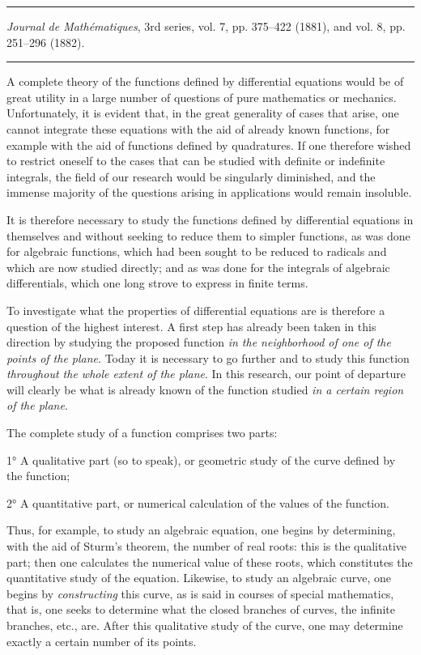\documentclass[11pt]{article}
\newcommand{\shortline}{\begin{center}\rule{3.5em}{0.4pt}\end{center}}
\begin{document}
\shortline

\begin{center}
\emph{Journal de Mathématiques}, 3rd series, vol. 7, pp. 375--422 (1881), and vol. 8, pp. 251--296 (1882).
\end{center}

\shortline

A complete theory of the functions defined by differential equations would be of great utility in a large number of questions of pure mathematics or mechanics. Unfortunately, it is evident that, in the great generality of cases that arise, one cannot integrate these equations with the aid of already known functions, for example with the aid of functions defined by quadratures. If one therefore wished to restrict oneself to the cases that can be studied with definite or indefinite integrals, the field of our research would be singularly diminished, and the immense majority of the questions arising in applications would remain insoluble.

It is therefore necessary to study the functions defined by differential equations in themselves and without seeking to reduce them to simpler functions, as was done for algebraic functions, which had been sought to be reduced to radicals and which are now studied directly; and as was done for the integrals of algebraic differentials, which one long strove to express in finite terms.

To investigate what the properties of differential equations are is therefore a question of the highest interest. A first step has already been taken in this direction by studying the proposed function \emph{in the neighborhood of one of the points of the plane}. Today it is necessary to go further and to study this function \emph{throughout the whole extent of the plane}. In this research, our point of departure will clearly be what is already known of the function studied \emph{in a certain region of the plane}.

The complete study of a function comprises two parts:

1° A qualitative part (so to speak), or geometric study of the curve defined by the function;

2° A quantitative part, or numerical calculation of the values of the function.

Thus, for example, to study an algebraic equation, one begins by determining, with the aid of Sturm’s theorem, the number of real roots: this is the qualitative part; then one calculates the numerical value of these roots, which constitutes the quantitative study of the equation. Likewise, to study an algebraic curve, one begins by \emph{constructing} this curve, as is said in courses of special mathematics, that is, one seeks to determine what the closed branches of curves, the infinite branches, etc., are. After this qualitative study of the curve, one may determine exactly a certain number of its points.
\end{document}
